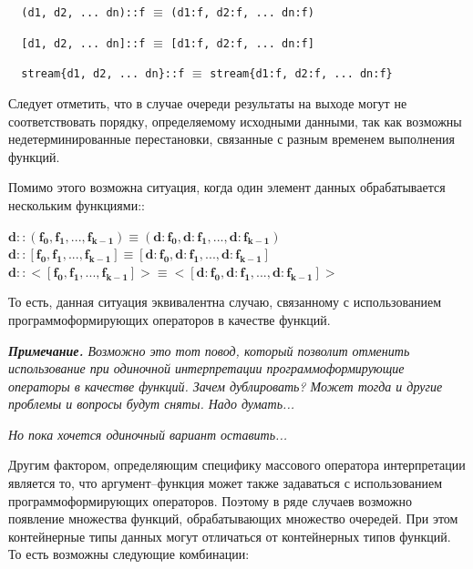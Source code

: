\verb|  (d1, d2, ... dn)::f| $\equiv$ \verb|(d1:f, d2:f, ... dn:f)|

\verb|  [d1, d2, ... dn]::f| $\equiv$ \verb|[d1:f, d2:f, ... dn:f]|

\verb|  stream{d1, d2, ... dn}::f| $\equiv$ \verb|stream{d1:f, d2:f, ... dn:f}|

Следует отметить, что в случае очереди результаты на выходе могут не соответствовать порядку, определяемому исходными данными, так как возможны недетерминированные перестановки, связанные с разным временем выполнения функций.

Помимо этого возможна ситуация, когда один элемент данных обрабатывается нескольким функциями::

\begin{center}
$\mathbf{d::(f_0, f_1, ..., f_{k-1}) \equiv (d:f_0, d:f_1, ..., d:f_{k-1})}$\\
$\mathbf{d::[f_0, f_1, ..., f_{k-1}] \equiv [d:f_0, d:f_1, ..., d:f_{k-1}]}$\\
$\mathbf{d::<[f_0, f_1, ..., f_{k-1}]> \equiv <[d:f_0, d:f_1, ..., d:f_{k-1}]>}$
\end{center}

То есть, данная ситуация эквивалентна случаю, связанному с использованием программоформирующих операторов в качестве функций.

\textit{\textbf{Примечание.}
Возможно это тот повод, который позволит отменить использование при одиночной интерпретации программоформирующие операторы в качестве функций. Зачем дублировать? Может тогда и другие проблемы и вопросы будут сняты. Надо думать...}

\textit{Но пока хочется одиночный вариант оставить...}

Другим фактором, определяющим специфику массового оператора интерпретации является то, что аргумент--функция может также задаваться с использованием программоформирующих операторов. Поэтому в ряде случаев возможно появление множества функций, обрабатывающих множество очередей. При этом контейнерные типы данных могут отличаться от контейнерных типов функций. То есть возможны следующие комбинации:

